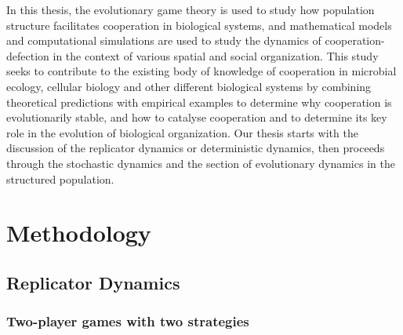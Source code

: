 \documentclass{article}
\begin{document}
In this thesis, the evolutionary game theory is used to study how population structure facilitates cooperation in biological systems, and mathematical models and computational simulations are used to study the dynamics of cooperation-defection in the context of various spatial and social organization. This study seeks to contribute to the existing body of knowledge of cooperation in microbial ecology, cellular biology and other different biological systems by combining theoretical predictions with empirical examples to determine why cooperation is evolutionarily stable, and how to catalyse cooperation and to determine its key role in the evolution of biological organization.
Our thesis starts with the discussion of the replicator dynamics or deterministic  dynamics, then proceeds through the stochastic dynamics and the section of evolutionary dynamics in the structured population.

\section{Methodology}
\subsection{Replicator Dynamics}
\label{subsec:Replicator Dynamics}
\subsubsection{Two-player games with two strategies}
\label{subsubsec:Two-player games with two strategies}
\end{document}
